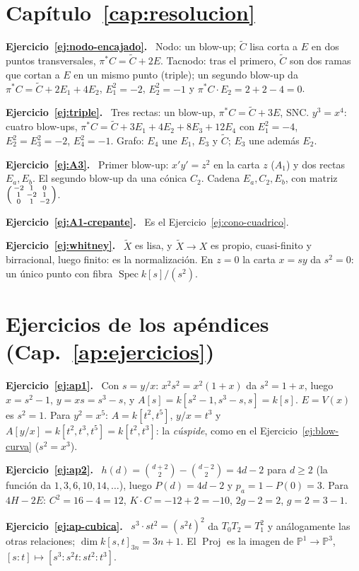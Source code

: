 \documentclass[11pt,a4paper,oneside]{book}
\newcommand{\Spec}{\operatorname{Spec}}
\newcommand{\Proj}{\operatorname{Proj}}
\newcommand{\PP}{\mathbb{P}}
\theoremstyle{plain}
\theoremstyle{definition}
\theoremstyle{remark}
\newcounter{ejer}[chapter]
\newcommand{\sol}[1]{\par\medskip\noindent\textbf{Ejercicio~\ref{#1}.}\ }
\begin{document}
\section*{Capítulo~\ref{cap:resolucion}}
\sol{ej:nodo-encajado} Nodo: un blow-up; $\tilde C$ lisa corta a $E$ en dos puntos transversales, $\pi^*C=\tilde C+2E$. Tacnodo: tras el primero, $\tilde C$ son dos ramas que cortan a $E$ en un mismo punto (triple); un segundo blow-up da $\pi^*C=\tilde C+2E_1+4E_2$, $E_1^2=-2$, $E_2^2=-1$ y $\pi^*C\cdot E_2=2+2-4=0$.

\sol{ej:triple} Tres rectas: un blow-up, $\pi^*C=\tilde C+3E$, SNC. $y^3=x^4$: cuatro blow-ups, $\pi^*C=\tilde C+3E_1+4E_2+8E_3+12E_4$ con $E_1^2=-4$, $E_2^2=E_3^2=-2$, $E_4^2=-1$. Grafo: $E_4$ une $E_1$, $E_3$ y $\tilde C$; $E_3$ une además $E_2$.

\sol{ej:A3} Primer blow-up: $x'y'=z^2$ en la carta $z$ ($A_1$) y dos rectas $E_a,E_b$. El segundo blow-up da una cónica $C_2$. Cadena $E_a,C_2,E_b$, con matriz $\begin{psmallmatrix}-2&1&0\\1&-2&1\\0&1&-2\end{psmallmatrix}$.

\sol{ej:A1-crepante} Es el Ejercicio~\ref{ej:cono-cuadrico}.

\sol{ej:whitney} $\tilde X$ es lisa, y $\tilde X\to X$ es propio, cuasi-finito y birracional, luego finito: es la normalización. En $z=0$ la carta $x=sy$ da $s^2=0$: un único punto con fibra $\Spec k[s]/(s^2)$.

\section*{Ejercicios de los apéndices (Cap.~\ref{ap:ejercicios})}
\sol{ej:ap1} Con $s=y/x$: $x^2s^2=x^2(1+x)$ da $s^2=1+x$, luego $x=s^2-1$, $y=xs=s^3-s$, y $A[s]=k[s^2-1,s^3-s,s]=k[s]$. $E=V(x)$ es $s^2=1$. Para $y^2=x^5$: $A=k[t^2,t^5]$, $y/x=t^3$ y $A[y/x]=k[t^2,t^3,t^5]=k[t^2,t^3]$: la \emph{cúspide}, como en el Ejercicio~\ref{ej:blow-curva} ($s^2=x^3$).

\sol{ej:ap2} $h(d)=\binom{d+2}2-\binom{d-2}2=4d-2$ para $d\ge2$ (la función da $1,3,6,10,14,\dots$), luego $P(d)=4d-2$ y $p_a=1-P(0)=3$. Para $4H-2E$: $C^2=16-4=12$, $K\cdot C=-12+2=-10$, $2g-2=2$, $g=2=3-1$.

\sol{ej:ap-cubica} $s^3\cdot st^2=(s^2t)^2$ da $T_0T_2=T_1^2$ y análogamente las otras relaciones; $\dim k[s,t]_{3n}=3n+1$. El $\Proj$ es la imagen de $\PP^1\to\PP^3$, $[s:t]\mapsto[s^3:s^2t:st^2:t^3]$.
\end{document}
